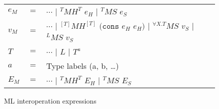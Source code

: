 \begin{figure}[p]
\label{mie}
\caption{ML interoperation expressions}
\begin{center}
\begin{tabular}{lcl}
$e_{M}$ & $=$ & $\cdots$ $\vert$ $^{T}MH^{T}$ $e_{H}$ $\vert$ $^{T}MS$ $e_{S}$ \\
$v_{M}$ & $=$ & $\cdots$ $\vert$ $^{[T]}MH^{[T]}$ $(\mathtt{cons}$ $e_{H}$ $e_{H})$ $\vert$ $^{\forall X.T}MS$ $v_{S}$ $\vert$ $^{L}MS$ $v_{S}$ \\
$T$ & $=$ & $\cdots$ $\vert$ $L$ $\vert$ $T^{a}$ \\
$a$ & $=$ & Type labels (a, b, \ldots) \\
$E_{M}$ & $=$ & $\cdots$ $\vert$ $^{T}MH^{T}$ $E_{H}$ $\vert$ $^{T}MS$ $E_{S}$
\end{tabular}
\end{center}
\end{figure}
